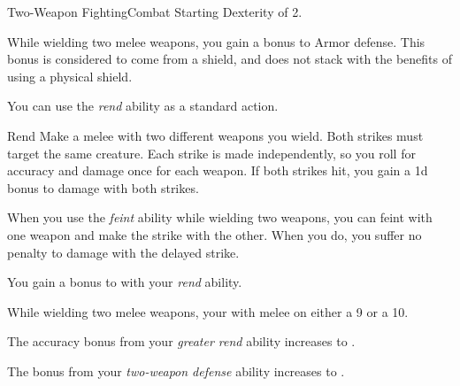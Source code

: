     \begin{feat}{Two-Weapon Fighting}{Combat}
        \featpre Starting Dexterity of 2.

         While wielding two melee weapons, you gain a  bonus to Armor defense.
        This bonus is considered to come from a shield, and does not stack with the benefits of using a physical shield.

         You can use the \textit{rend} ability as a standard action.
        \begin{apability}{Rend}
            Make a melee  with two different weapons you wield.
            Both strikes must target the same creature.
            Each strike is made independently, so you roll for accuracy and damage once for each weapon.
            If both strikes hit, you gain a \plus1d bonus to damage with both strikes.
        \end{apability}

         When you use the \textit{feint} ability while wielding two weapons, you can feint with one weapon and make the strike with the other.
        When you do, you suffer no penalty to damage with the delayed strike.

         You gain a  bonus to  with your \textit{rend} ability.

         While wielding two melee weapons, your  with melee   on either a 9 or a 10.

         The accuracy bonus from your \textit{greater rend} ability increases to .

         The bonus from your \textit{two-weapon defense} ability increases to .
    \end{feat}

